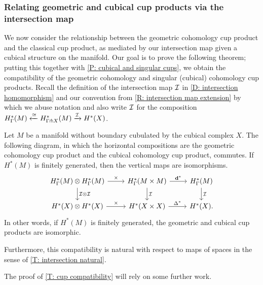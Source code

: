 \subsubsection{Relating geometric and cubical cup products via the intersection map}\label{S: cup via intersection}


We now consider the relationship between the geometric cohomology cup product and the classical cup product, as mediated by our intersection map given a cubical structure on the manifold.
Our goal is to prove the following theorem; putting this together with \cref{P: cubical and singular cups}, we obtain the compatibility of the geometric cohomology and singular (cubical) cohomology cup products.
Recall the definition of the intersection map $\mathcal{I}$ in \cref{D: intersection homomorphism} and our convention from \cref{R: intersection map extension} by which we abuse notation and also write $\mathcal{I}$ for the composition $H^*_\Gamma(M) \xleftarrow{\cong} H^*_{\Gamma \pitchfork X}(M) \xrightarrow{\mathcal{I}} H^*(X)$.

\begin{theorem}\label{T: cup compatibility}
	Let $M$ be a manifold without boundary cubulated by the cubical complex $X$.
	The following diagram, in which the horizontal compositions are the geometric cohomology cup product and the cubical cohomology cup product, commutes.
	If $H^*(M)$ is finitely generated, then the vertical maps are isomorphisms.
		\[
		\begin{tikzcd}
		H^*_\Gamma(M) \otimes H^*_\Gamma(M) \arrow[r,"\times"]\arrow[d,"\mc I \otimes \mc I"]& H^*_\Gamma(M \times M) \arrow[d,"\mc I"]\arrow[r,"\diag^*"] & H^*_\Gamma(M) \arrow[d,"\mc I"]\\
		H^*(X) \otimes H^*(X) \arrow[r,"\times"]& H^*(X \times X) \arrow[r,"\Delta^*"] & H^*(X).
		\end{tikzcd}
		\]
	In other words, if $H^*(M)$ is finitely generated, the geometric and cubical cup products are isomorphic.

	Furthermore, this compatibility is natural with respect to maps of spaces in the sense of \cref{T: intersection natural}.
\end{theorem}

The proof of \cref{T: cup compatibility} will rely on some further work.

